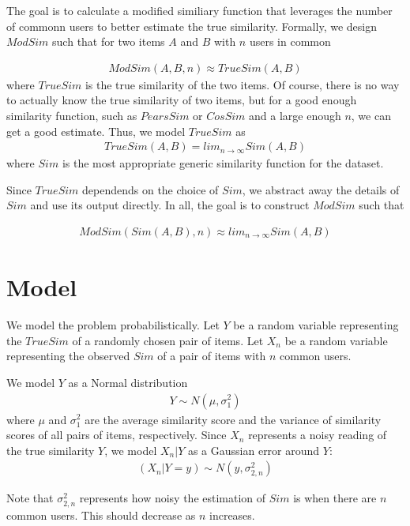 \documentclass[11pt]{article}
\begin{document}
The goal is to calculate a modified similiary function that leverages the number
of commonn users to better estimate the true similarity. Formally, we design
$ModSim$ such that for two items $A$ and $B$ with $n$ users in common

\begin{align}
ModSim(A, B, n) \approx TrueSim(A, B)
\end{align}
where $TrueSim$ is the true similarity of the two items. Of course, there is no
way to actually know the true similarity of two items, but for a good enough
similarity function, such as $PearsSim$ or $CosSim$ and a large enough $n$, we
can get a good estimate. Thus, we model $TrueSim$ as 
\begin{align}
TrueSim(A, B) = lim_{n\to\infty}Sim(A, B)
\end{align}
where $Sim$ is the most appropriate generic similarity function for the dataset.

Since $TrueSim$ dependends on the choice of $Sim$, we abstract away the details
of $Sim$ and use its output directly. In all, the goal is to construct $ModSim$
such that

\begin{align}
ModSim(Sim(A, B), n) \approx lim_{n\to\infty}Sim(A, B)
\end{align}

\section*{Model}

We model the problem probabilistically. Let $Y$ be a random variable
representing the $TrueSim$ of a randomly chosen pair of items. Let $X_n$ be a
random variable representing the observed $Sim$ of a pair of items with $n$
common users.

We model $Y$ as a Normal distribution 
\begin{align}
Y \sim N(\mu, \sigma_{1}^2)
\end{align}
where $\mu$ and $\sigma_{1}^2$ are the average similarity score and the variance
of similarity scores of all pairs of items, respectively. Since $X_n$ represents
a noisy reading of the true similarity $Y$, we model $X_n | Y$ as a Gaussian
error around $Y$:
\begin{align}
(X_n | Y=y) \sim N(y, \sigma_{2, n}^2)
\end{align}

Note that $\sigma_{2, n}^2$ represents how noisy the estimation of $Sim$ is when
there are $n$ common users. This should decrease as $n$ increases.
\end{document}
